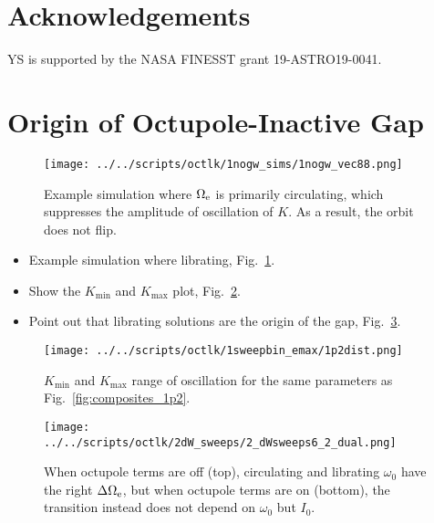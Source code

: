 \documentclass[
        fleqn,
        usenatbib,
    ]{mnras}
\newlength{\colummwidth}
\begin{document}
\section{Acknowledgements}\label{s:ack}

YS is supported by the NASA FINESST grant 19-ASTRO19-0041.%




\clearpage
\onecolumn

\appendix

\section{Origin of Octupole-Inactive Gap}\label{app:gap}

\begin{figure}
    \centering
    \texttt{[image: ../../scripts/octlk/1nogw\_sims/1nogw\_vec88.png]}
    \caption{Example simulation where $\Omega_{\rm e}$ is primarily circulating,
    which suppresses the amplitude of oscillation of $K$. As a result, the orbit
    does not flip.}\label{fig:nogw_circ}
\end{figure}

\begin{itemize}
    \item Example simulation where librating, Fig.~\ref{fig:nogw_circ}.

    \item Show the $K_{\min}$ and $K_{\max}$ plot, Fig.~\ref{fig:kdist}.

    \item Point out that librating solutions are the origin of the gap,
        Fig.~\ref{fig:dW}.
\end{itemize}

\begin{figure}
    \centering
    \texttt{[image: ../../scripts/octlk/1sweepbin\_emax/1p2dist.png]}
    \caption{$K_{\min}$ and $K_{\max}$ range of oscillation for the same
    parameters as Fig.~\ref{fig:composites_1p2}.}\label{fig:kdist}
\end{figure}
\begin{figure}
    \centering
    \texttt{[image: ../../scripts/octlk/2dW\_sweeps/2\_dWsweeps6\_2\_dual.png]}
    \caption{When octupole terms are off (top), circulating and librating
    $\omega_0$ have the right $\Delta \Omega_{\rm e}$, but when octupole terms
    are on (bottom), the transition instead does not depend on $\omega_0$ but
    $I_0$. }\label{fig:dW}
\end{figure}

\label{lastpage} %
\end{document}
